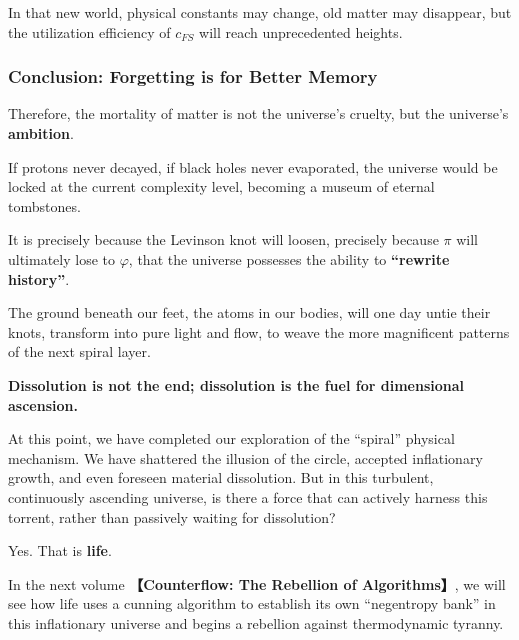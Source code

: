 In that new world, physical constants may change, old matter may disappear, but the utilization efficiency of $c_{FS}$ will reach unprecedented heights.

\subsubsection{Conclusion: Forgetting is for Better Memory}

Therefore, the mortality of matter is not the universe's cruelty, but the universe's \textbf{ambition}.

If protons never decayed, if black holes never evaporated, the universe would be locked at the current complexity level, becoming a museum of eternal tombstones.

It is precisely because the Levinson knot will loosen, precisely because $\pi$ will ultimately lose to $\varphi$, that the universe possesses the ability to \textbf{``rewrite history''}.

The ground beneath our feet, the atoms in our bodies, will one day untie their knots, transform into pure light and flow, to weave the more magnificent patterns of the next spiral layer.

\textbf{Dissolution is not the end; dissolution is the fuel for dimensional ascension.}

At this point, we have completed our exploration of the ``spiral'' physical mechanism. We have shattered the illusion of the circle, accepted inflationary growth, and even foreseen material dissolution. But in this turbulent, continuously ascending universe, is there a force that can actively harness this torrent, rather than passively waiting for dissolution?

Yes. That is \textbf{life}.

In the next volume \textbf{【Counterflow: The Rebellion of Algorithms】}, we will see how life uses a cunning algorithm to establish its own ``negentropy bank'' in this inflationary universe and begins a rebellion against thermodynamic tyranny.

